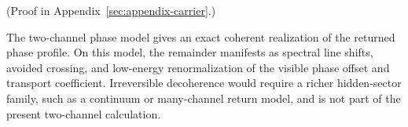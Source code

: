 (Proof in Appendix~\ref{sec:appendix-carrier}.)

The two-channel phase model gives an exact coherent realization of the returned
phase profile. On this model, the remainder manifests as spectral line shifts,
avoided crossing, and low-energy renormalization of the visible phase offset
and transport coefficient. Irreversible decoherence would require a richer
hidden-sector family, such as a continuum or many-channel return model, and is
not part of the present two-channel calculation.
